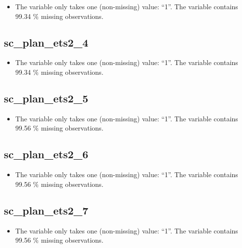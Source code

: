 \documentclass[
  letterpaper,
  DIV=11,
  numbers=noendperiod]{scrartcl}
\providecommand{\tightlist}{%
  \setlength{\itemsep}{0pt}\setlength{\parskip}{0pt}}
\begin{document}
\begin{itemize}
\tightlist
\item
  The variable only takes one (non-missing) value: ``1''. The variable
  contains 99.34 \% missing observations.
\end{itemize}

\fullline

\subsection{sc\_plan\_ets2\_4}\label{sc_plan_ets2_4}

\begin{itemize}
\tightlist
\item
  The variable only takes one (non-missing) value: ``1''. The variable
  contains 99.34 \% missing observations.
\end{itemize}

\fullline

\subsection{sc\_plan\_ets2\_5}\label{sc_plan_ets2_5}

\begin{itemize}
\tightlist
\item
  The variable only takes one (non-missing) value: ``1''. The variable
  contains 99.56 \% missing observations.
\end{itemize}

\fullline

\subsection{sc\_plan\_ets2\_6}\label{sc_plan_ets2_6}

\begin{itemize}
\tightlist
\item
  The variable only takes one (non-missing) value: ``1''. The variable
  contains 99.56 \% missing observations.
\end{itemize}

\fullline

\subsection{sc\_plan\_ets2\_7}\label{sc_plan_ets2_7}

\begin{itemize}
\tightlist
\item
  The variable only takes one (non-missing) value: ``1''. The variable
  contains 99.56 \% missing observations.
\end{itemize}
\end{document}
